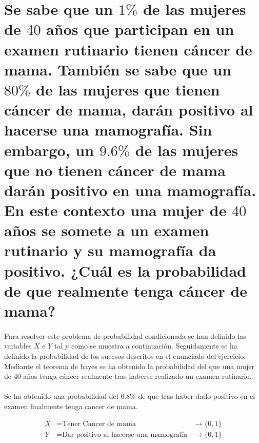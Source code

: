 \documentclass{article}
\begin{document}
	\maketitle %

	\thispagestyle{fancy} %



	\begin{abstract}
		\noindent [TODO ]
	\end{abstract}



	\section{Se sabe que un $1\%$ de las mujeres de $40$ años que participan en un examen rutinario tienen cáncer de mama. También se sabe que un $80\%$ de las mujeres que tienen cáncer de mama, darán positivo al hacerse una mamografía. Sin embargo, un $9.6\%$ de las mujeres que no tienen cáncer de mama darán positivo en una mamografía. En este contexto una mujer de $40$ años se somete a un examen rutinario y su mamografía da positivo. ¿Cuál es la probabilidad de que realmente tenga cáncer de mama?}
	\label{sec:e1}

		\paragraph{}
		Para resolver este problema de probabilidad condicionada se han definido las variables $X$ e $Y$ tal y como se muestra a continuación. Seguidamente se ha definido la probabilidad de los sucesos descritos en el enunciado del ejercicio. Mediante el teorema de bayes se ha obtenido la probabilidad del que una mujer de 40 años tenga cáncer realmente tras haberse realizado un examen rutinario.

		\paragraph{}
		Se ha obtenido una probabilidad del \textbf{$0.8\%$} de que tras haber dado positivo en el examen finalmente tenga cancer de mama.

		\begin{align}
			X &= \text{Tener Cancer de mama} 										&\rightarrow \{0,1\} \\
			Y &= \text{Dar positivo al hacerse una mamografía} 	&\rightarrow \{0,1\}
		\end{align}
\end{document}
